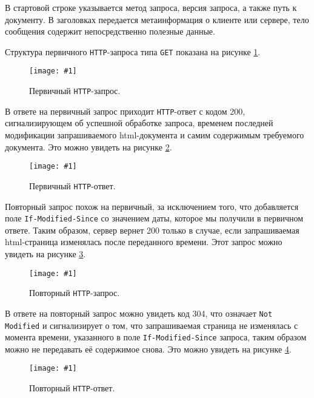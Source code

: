 \documentclass[12pt, a4paper]{article}
\newcommand{\figc}[4]{
  \begin{figure}[h]
  \begin{center}
    \texttt{[image: \#1]}
    \caption{#2}
    \label{fig:#3}
  \end{center}
  \end{figure}
}
\begin{document}
В стартовой строке указывается метод запроса, версия запроса, а также путь к
документу. В заголовках передается метаинформация о клиенте или сервере, тело
сообщения содержит непосредственно полезные данные.

Структура первичного \texttt{HTTP}-запроса типа \texttt{GET} показана на рисунке
\ref{fig:h_f_g}.

\figc{http_first_get}{Первичный \texttt{HTTP}-запрос.}{h_f_g}{2.5}

В ответе на первичный запрос приходит \texttt{HTTP}-ответ с кодом 200,
сигнализирующем об успешной обработке запроса, временем последней модификации
запрашиваемого html-документа и самим содержимым требуемого документа. Это
можно увидеть на рисунке \ref{fig:h_f_r}.

\figc{http_first_res}{Первичный \texttt{HTTP}-ответ.}{h_f_r}{2.5}

\newpage

Повторный запрос похож на первичный, за исключением того, что добавляется поле
\texttt{If-Modified-Since} со значением даты, которое мы получили в первичном
ответе. Таким образом, сервер вернет 200 только в случае, если запрашиваемая
html-страница изменялась после переданного времени. Этот запрос можно увидеть
на рисунке \ref{fig:h_s_g}.

\figc{http_second_get}{Повторный \texttt{HTTP}-запрос.}{h_s_g}{2.5}

В ответе на повторный запрос можно увидеть код 304, что означает \texttt{Not Modified}
и сигнализирует о том, что запрашиваемая страница не изменялась с момента времени,
указанного в поле \texttt{If-Modified-Since} запроса, таким образом можно не
передавать её содержимое снова. Это можно увидеть на рисунке \ref{fig:h_s_r}.

\figc{http_second_res}{Повторный \texttt{HTTP}-ответ.}{h_s_r}{2.5}
\end{document}
